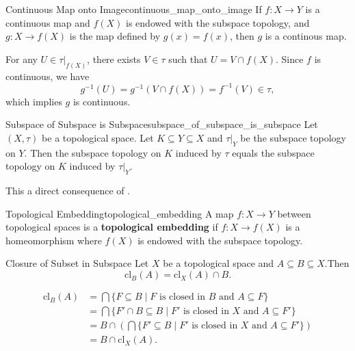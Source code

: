 \documentclass{report}
\begin{document}
\begin{proposition}{Continuous Map onto Image}{continuous_map_onto_image}
	If $f:X\to Y$ is a continuous map and $f(X)$ is endowed with the subspace topology, and $g:X\to f(X)$ is the map defined by $g(x)=f(x)$, then $g$ is a continous map.
\end{proposition}

\begin{prf}
	For any $U\in \tau|_{f(X)}$, there exists $V\in \tau$ such that $U=V\cap f(X)$. Since $f$ is continuous, we have
	\[
		g^{-1}(U)=g^{-1}\left(V\cap f(X)\right)=f^{-1}(V)\in \tau,
	\]
	which implies $g$ is continuous.
\end{prf}



\begin{proposition}{Subspace of Subspace is Subspace}{subspace_of_subspace_is_subspace}
	Let $(X, \tau)$ be a topological space. Let $K \subseteq Y \subseteq X$ and $\tau |_Y$ be the subspace topology on $Y$. Then the subspace topology on $K$ induced by $\tau$ equals the subspace topology on $K$ induced by $\tau|_Y$.
\end{proposition}
\begin{prf}
	This a direct consequence of .
\end{prf}

\begin{definition}{Topological Embedding}{topological_embedding}
	A map $f:X\to Y$ between topological spaces is a \textbf{topological embedding} if $f:X\to f(X)$ is a homeomorphism where $f(X)$ is endowed with the subspace topology.
\end{definition}


\begin{proposition}{Closure of Subset in Subspace}{}
	Let $X$ be a topological space and $A\subseteq B\subseteq X$.Then 
	\[
	\mathrm{cl}_{B}(A)=\mathrm{cl}_{X}(A)\cap B.
	\]
\end{proposition}
\begin{prf}
	\begin{align*}
		\mathrm{cl}_{B}(A)&=\bigcap\{F\subseteq B\mid F\text{ is closed in $B$ and }A\subseteq F\}\\
		&=\bigcap\{F'\cap B\subseteq B\mid F'\text{ is closed in $X$ and }A\subseteq F'\}\\
		&=B\cap\left(\bigcap \{F'\subseteq B\mid F'\text{ is closed in $X$ and }A\subseteq F'\}\right)\\
		&=B\cap \mathrm{cl}_{X}(A).
	\end{align*}
	
\end{prf}
\end{document}
